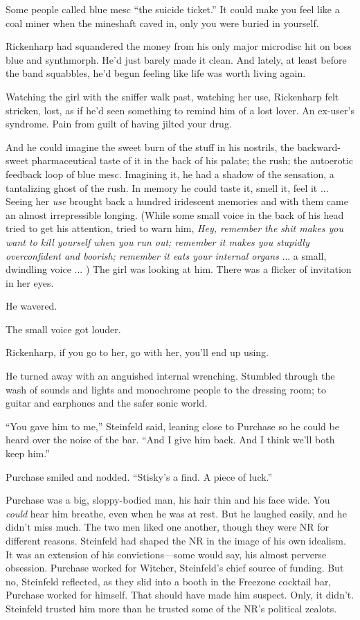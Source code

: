 Some people called blue mesc ``the suicide ticket.'' It could make you feel like a coal miner when the mineshaft caved in, only you were buried in yourself.

Rickenharp had squandered the money from his only major microdisc hit on boss blue and synthmorph. He'd just barely made it clean. And lately, at least before the band squabbles, he'd begun feeling like life was worth living again.

Watching the girl with the sniffer walk past, watching her use, Rickenharp felt stricken, lost, as if he'd seen something to remind him of a lost lover. An ex-user's syndrome. Pain from guilt of having jilted your drug.

And he could imagine the sweet burn of the stuff in his nostrils, the backward-sweet pharmaceutical taste of it in the back of his palate; the rush; the autoerotic feedback loop of blue mesc. Imagining it, he had a shadow of the sensation, a tantalizing ghost of the rush. In memory he could taste it, smell it, feel it ... Seeing her \textit{use} brought back a hundred iridescent memories and with them came an almost irrepressible longing. (While some small voice in the back of his head tried to get his attention, tried to warn him, \textit{Hey, remember the shit makes you want to kill yourself when you run out; remember it makes you stupidly overconfident and boorish; remember it eats your internal organs} ... a small, dwindling voice ... ) The girl was looking at him. There was a flicker of invitation in her eyes.

He wavered.

The small voice got louder.

Rickenharp, if you go to her, go with her, you'll end up using.

He turned away with an anguished internal wrenching. Stumbled through the wash of sounds and lights and monochrome people to the dressing room; to guitar and earphones and the safer sonic world.

``You gave him to me,'' Steinfeld said, leaning close to Purchase so he could be heard over the noise of the bar. ``And I give him back. And I think we'll both keep him.''

Purchase smiled and nodded. ``Stisky's a find. A piece of luck.''

Purchase was a big, sloppy-bodied man, his hair thin and his face wide. You \textit{could} hear him breathe, even when he was at rest. But he laughed easily, and he didn't miss much. The two men liked one another, though they were NR for different reasons. Steinfeld had shaped the NR in the image of his own idealism. It was an extension of his convictions---some would say, his almost perverse obsession. Purchase worked for Witcher, Steinfeld's chief source of funding. But no, Steinfeld reflected, as they slid into a booth in the Freezone cocktail bar, Purchase worked for himself. That should have made him suspect. Only, it didn't. Steinfeld trusted him more than he trusted some of the NR's political zealots.

